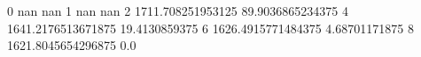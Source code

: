 0 nan nan
1 nan nan
2 1711.708251953125 89.9036865234375
4 1641.2176513671875 19.4130859375
6 1626.4915771484375 4.68701171875
8 1621.8045654296875 0.0
